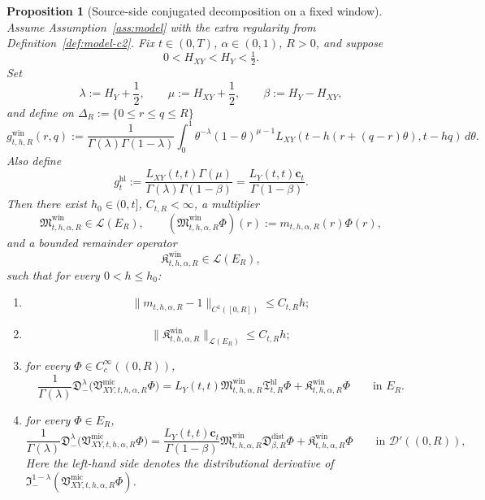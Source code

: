 \documentclass[11pt,a4paper]{amsart}
\theoremstyle{plain}
\newtheorem{proposition}[theorem]{Proposition}
\theoremstyle{definition}
\theoremstyle{remark}
\begin{document}
\begin{proposition}[Source-side conjugated decomposition on a fixed window]
\label{prop:micro-window-decompose}
Assume Assumption~\ref{ass:model} with the extra regularity from Definition~\ref{def:model-c2}.
Fix \(t\in(0,T)\), \(\alpha\in(0,1)\), \(R>0\), and suppose
\[
0<H_{XY}<H_Y<\tfrac12.
\]
Set
\[
\lambda:=H_Y+\frac12,
\qquad
\mu:=H_{XY}+\frac12,
\qquad
\beta:=H_Y-H_{XY},
\]
and define on \(\Delta_R:=\{0\le r\le q\le R\}\)
\[
g_{t,h,R}^{\mathrm{win}}(r,q)
:=
\frac{1}{\Gamma(\lambda)\Gamma(1-\lambda)}
\int_0^1
\theta^{-\lambda}(1-\theta)^{\mu-1}
L_{XY}(t-h(r+(q-r)\theta),t-hq)\,d\theta.
\]
Also define
\[
g_t^{\mathrm{hl}}
:=
\frac{L_{XY}(t,t)\Gamma(\mu)}{\Gamma(\lambda)\Gamma(1-\beta)}
=
\frac{L_Y(t,t)\mathbf c_t}{\Gamma(1-\beta)}.
\]
Then there exist \(h_0\in(0,t]\), \(C_{t,R}<\infty\), a multiplier
\[
\mathfrak M_{t,h,\alpha,R}^{\mathrm{win}}\in \mathcal L(E_R),
\qquad
(\mathfrak M_{t,h,\alpha,R}^{\mathrm{win}}\Phi)(r)
:=
m_{t,h,\alpha,R}(r)\Phi(r),
\]
and a bounded remainder operator
\[
\mathfrak K_{t,h,\alpha,R}^{\mathrm{win}}\in\mathcal L(E_R),
\]
such that for every \(0<h\le h_0\):
\begin{enumerate}[label=(\roman*)]
\item
\begin{equation}\label{eq:window-mult-close}
\|m_{t,h,\alpha,R}-1\|_{C^1([0,R])}\le C_{t,R}h;
\end{equation}
\item
\begin{equation}\label{eq:window-remainder-bound}
\|\mathfrak K_{t,h,\alpha,R}^{\mathrm{win}}\|_{\mathcal L(E_R)}
\le
C_{t,R}h;
\end{equation}
\item for every \(\Phi\in C_c^\infty((0,R))\),
\begin{equation}\label{eq:window-source-decompose}
\frac{1}{\Gamma(\lambda)}
\mathfrak D_-^\lambda
\bigl(
\mathfrak V_{XY,t,h,\alpha,R}^{\mathrm{mic}}\Phi
\bigr)
=
L_Y(t,t)\mathfrak M_{t,h,\alpha,R}^{\mathrm{win}}
\mathfrak T_{t,R}^{\mathrm{hl}}\Phi
+
\mathfrak K_{t,h,\alpha,R}^{\mathrm{win}}\Phi
\qquad\text{in }E_R.
\end{equation}
\item for every \(\Phi\in E_R\),
\begin{equation}\label{eq:window-source-decompose-dist}
\frac{1}{\Gamma(\lambda)}
\mathfrak D_-^\lambda
\bigl(
\mathfrak V_{XY,t,h,\alpha,R}^{\mathrm{mic}}\Phi
\bigr)
=
\frac{L_Y(t,t)\mathbf c_t}{\Gamma(1-\beta)}
\mathfrak M_{t,h,\alpha,R}^{\mathrm{win}}
\mathfrak D_{\beta,R}^{\mathrm{dist}}\Phi
+
\mathfrak K_{t,h,\alpha,R}^{\mathrm{win}}\Phi
\qquad\text{in }\mathcal D'((0,R)),
\end{equation}
Here the left-hand side denotes the distributional derivative of
\(\mathfrak I_-^{1-\lambda}(\mathfrak V_{XY,t,h,\alpha,R}^{\mathrm{mic}}\Phi)\).
\end{enumerate}
\end{proposition}
\end{document}
